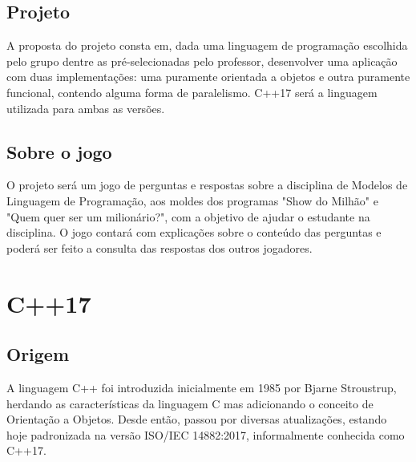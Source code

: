 \documentclass[rel_mlp]{iiufrgs}
\begin{document}
\section{Projeto}



A proposta do projeto consta em, dada uma linguagem de programação escolhida pelo grupo dentre as pré-selecionadas pelo professor, desenvolver uma aplicação com duas implementações: uma puramente orientada a objetos e outra puramente funcional, contendo alguma forma de paralelismo. C++17 será a linguagem utilizada para ambas as versões.

\section{Sobre o jogo}
O projeto será um jogo de perguntas e respostas sobre a disciplina de Modelos de Linguagem de Programação, aos moldes dos programas "Show do Milhão" e "Quem quer ser um milionário?", com a objetivo de ajudar o estudante na disciplina. O jogo contará com explicações sobre o conteúdo das perguntas e poderá ser feito a consulta das respostas dos outros jogadores. 

\chapter{C++17}\label{c++}

\section{Origem}
A linguagem C++ foi introduzida inicialmente em 1985 por Bjarne Stroustrup, herdando as características da linguagem C mas adicionando o conceito de Orientação a Objetos. Desde então, passou por diversas atualizações, estando hoje padronizada na versão ISO/IEC 14882:2017, informalmente conhecida como C++17.
\end{document}
